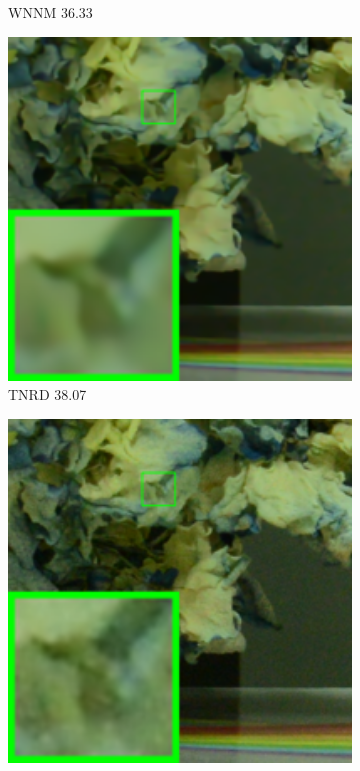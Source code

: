 \begin{figure}
\begin{subfigure}[t]{0.19\textwidth}
\caption{WNNM 36.33}
    \end{subfigure}
    \hfill
    \begin{subfigure}[t]{0.19\textwidth}
        \centering
        \includegraphics[width=1\textwidth]{images/twsc/cc/resize_br_TRD_d800_iso1600_1_real.png}
\caption{TNRD 38.07}
    \end{subfigure}
    \hfill
    \begin{subfigure}[t]{0.19\textwidth}
        \centering
        \includegraphics[width=1\textwidth]{images/twsc/cc/resize_br_DnCNN_d800_iso1600_1_real.png}

\end{subfigure}
\end{figure}
